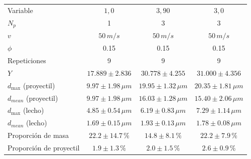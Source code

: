 \begin{tabular}{lccc}
Variable & $1,0$ & $3,90$ & $3,0$ \\
$N_p$ & 1 & 3 & 3 \\
$v$ & $50\,m/s$ & $50\,m/s$ & $50\,m/s$ \\
$\phi$ & 0.15 & 0.15 & 0.15 \\
Repeticiones & 9 & 9 & 9 \\
\hline
\hline
$Y$ & $17.889\pm2.836$ & $30.778\pm4.255$ & $31.000\pm4.356$ \\
$d_{\max}$ (proyectil) & $9.97\pm1.98\,\mu m$ & $19.95\pm1.32\,\mu m$ & $20.35\pm1.81\,\mu m$ \\
$d_{mean}$ (proyectil) & $9.97\pm1.98\,\mu m$ & $16.03\pm1.28\,\mu m$ & $15.40\pm2.06\,\mu m$ \\
$d_{\max}$ (lecho) & $4.85\pm0.54\,\mu m$ & $6.19\pm0.83\,\mu m$ & $7.29\pm1.14\,\mu m$ \\
$d_{mean}$ (lecho) & $1.69\pm0.15\,\mu m$ & $1.93\pm0.13\,\mu m$ & $1.78\pm0.08\,\mu m$ \\
Proporci\'on de masa & $22.2\pm14.7\,\%$ & $14.8\pm8.1\,\%$ & $22.2\pm7.9\,\%$ \\
Proporci\'on de proyectil & $1.9\pm1.3\,\%$ & $2.0\pm1.5\,\%$ & $2.6\pm0.9\,\%$ \\
\end{tabular}
